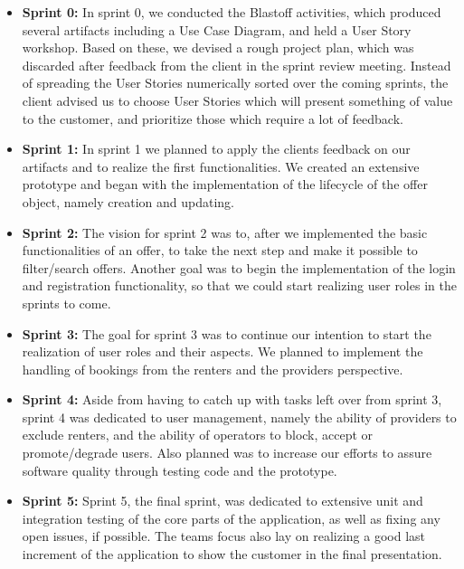 \begin{itemize}
    
    \item \textbf{Sprint 0:} In sprint 0, we conducted the Blastoff activities, which produced several artifacts including a Use Case Diagram, and held a User Story workshop. Based on these, we devised a rough project plan, which was discarded after feedback from the client in the sprint review meeting. Instead of spreading the User Stories numerically sorted over the coming sprints, the client advised us to choose User Stories which will present something of value to the customer, and prioritize those which require a lot of feedback.

    \item \textbf{Sprint 1:} In sprint 1 we planned to apply the clients feedback on our artifacts and to realize the first functionalities. We created an extensive prototype and began with the implementation of the lifecycle of the offer object, namely creation and updating.

    \item \textbf{Sprint 2:} The vision for sprint 2 was to, after we implemented the basic functionalities of an offer, to take the next step and make it possible to filter/search offers. Another goal was to begin the implementation of the login and registration functionality, so that we could start realizing user roles in the sprints to come.

    \item \textbf{Sprint 3:} The goal for sprint 3 was to continue our intention to start the realization of user roles and their aspects. We planned to implement the handling of bookings from the renters and the providers perspective.

    \item \textbf{Sprint 4:} Aside from having to catch up with tasks left over from sprint 3, sprint 4 was dedicated to user management, namely the ability of providers to exclude renters, and the ability of operators to block, accept or promote/degrade users. Also planned was to increase our efforts to assure software quality through testing code and the prototype.

    \item \textbf{Sprint 5:} Sprint 5, the final sprint, was dedicated to extensive unit and integration testing of the core parts of the application, as well as fixing any open issues, if possible. The teams focus also lay on realizing a good last increment of the application to show the customer in the final presentation.

\end{itemize}